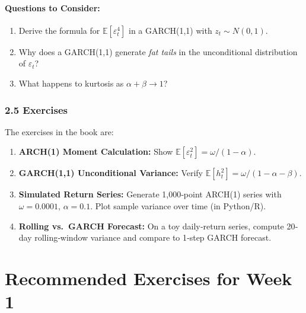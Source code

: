 \documentclass[11pt]{amsart}
\begin{document}
\paragraph{Questions to Consider:}
\begin{enumerate}[noitemsep,left=0pt]
  \item Derive the formula for $\mathbb{E}[\varepsilon_t^4]$ in a GARCH(1,1) with $z_t \sim N(0,1)$.
  \item Why does a GARCH(1,1) generate \emph{fat tails} in the unconditional distribution of $\varepsilon_t$?
  \item What happens to kurtosis as $\alpha + \beta \to 1$?
\end{enumerate}

\subsubsection{2.5 Exercises}
The exercises in the book are:
\begin{enumerate}[noitemsep,left=0pt]
  \item \textbf{ARCH(1) Moment Calculation:} Show $\mathbb{E}[\varepsilon_t^2] = \omega/(1 - \alpha)$.
  \item \textbf{GARCH(1,1) Unconditional Variance:} Verify $\mathbb{E}[h_t^2] = \omega/(1 - \alpha - \beta)$.
  \item \textbf{Simulated Return Series:} Generate 1{,}000‐point ARCH(1) series with $\omega=0.0001$, $\alpha=0.1$. Plot sample variance over time (in Python/R).
  \item \textbf{Rolling vs.\ GARCH Forecast:} On a toy daily‐return series, compute 20‐day rolling‐window variance and compare to 1‐step GARCH forecast.
\end{enumerate}

\section{Recommended Exercises for Week 1}
\end{document}

